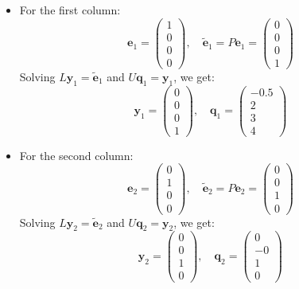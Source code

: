 \documentclass{article}
\begin{document}
\begin{itemize}
    \item For the first column:
          \[
              \mathbf{e}_1 = \begin{pmatrix} 1 \\ 0 \\ 0 \\ 0 \end{pmatrix}, \quad
              \tilde{\mathbf{e}}_1 = P \mathbf{e}_1 = \begin{pmatrix} 0 \\ 0 \\ 0 \\ 1 \end{pmatrix}
          \]
          Solving \( L \mathbf{y}_1 = \tilde{\mathbf{e}}_1 \) and \( U \mathbf{q}_1 = \mathbf{y}_1 \), we get:
          \[
              \mathbf{y}_1 = \begin{pmatrix} 0 \\ 0 \\ 0 \\ 1 \end{pmatrix}, \quad
              \mathbf{q}_1 = \begin{pmatrix} -0.5 \\ 2 \\ 3 \\ 4 \end{pmatrix}
          \]

    \item For the second column:
          \[
              \mathbf{e}_2 = \begin{pmatrix} 0 \\ 1 \\ 0 \\ 0 \end{pmatrix}, \quad
              \tilde{\mathbf{e}}_2 = P \mathbf{e}_2 = \begin{pmatrix} 0 \\ 0 \\ 1 \\ 0 \end{pmatrix}
          \]
          Solving \( L \mathbf{y}_2 = \tilde{\mathbf{e}}_2 \) and \( U \mathbf{q}_2 = \mathbf{y}_2 \), we get:
          \[
              \mathbf{y}_2 = \begin{pmatrix} 0 \\ 0 \\ 1 \\ 0 \end{pmatrix}, \quad
              \mathbf{q}_2 = \begin{pmatrix} 0 \\ -0 \\ 1 \\ 0 \end{pmatrix}
          \]


\end{itemize}
\end{document}
